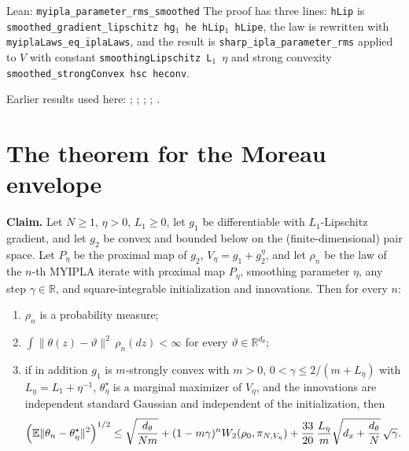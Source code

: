 \documentclass[11pt,a4paper]{article}
\begin{document}
\begin{leanbox}{Lean: \texttt{myipla\_\allowbreak{}parameter\_\allowbreak{}rms\_\allowbreak{}smoothed}}
The proof has three lines: \texttt{h\allowbreak{}Lip} is \texttt{smoothed\_\allowbreak{}gradient\_\allowbreak{}lipschitz hg\ensuremath{{}_{1}} he h\allowbreak{}Lip\ensuremath{{}_{1}} h\allowbreak{}Lipe}, the law is rewritten with \texttt{myipla\allowbreak{}Laws\_\allowbreak{}eq\_\allowbreak{}ipla\allowbreak{}Laws}, and the result is \texttt{sharp\_\allowbreak{}ipla\_\allowbreak{}parameter\_\allowbreak{}rms} applied to \(V\) with constant \texttt{smoothing\allowbreak{}Lipschitz L\ensuremath{{}_{1}} \ensuremath{\eta}} and strong convexity \texttt{smoothed\_\allowbreak{}strong\allowbreak{}Convex hsc heconv}.
\end{leanbox}


Earlier results used here: \cite[Section~3.17.4]{LangevinLean2026ULASC}; \cite[Section~3.1.1]{LangevinLean2026IPLA}; \cite[Section~3.1.6]{LangevinLean2026IPLA}; \cite[Section~3.3.1]{LangevinLean2026IPLA}; \cite[Section~3.3.2]{LangevinLean2026IPLA}.

\section{\texorpdfstring{The theorem for the Moreau envelope}{The theorem for the Moreau envelope}}


\textbf{Claim.} Let \(N\ge1\), \(\eta>0\), \(L_1\ge0\), let \(g_1\) be differentiable with \(L_1\)-Lipschitz gradient, and let \(g_2\) be convex and bounded below on the (finite-dimensional) pair space. Let \(P_\eta\) be the proximal map of \(g_2\), \(V_\eta=g_1+g_2^\eta\), and let \(\rho_n\) be the law of the \(n\)-th MYIPLA iterate with proximal map \(P_\eta\), smoothing parameter \(\eta\), any step \(\gamma\in\mathbb R\), and square-integrable initialization and innovations. Then for every \(n\):



\begin{enumerate}


\item \(\rho_n\) is a probability measure;

\item \(\int\|\theta(z)-\vartheta\|^2\,\rho_n(dz)<\infty\) for every \(\vartheta\in\mathbb R^{d_\theta}\);

\item if in addition \(g_1\) is \(m\)-strongly convex with \(m>0\), \(0<\gamma\le2/(m+L_\eta)\) with \(L_\eta=L_1+\eta^{-1}\), \(\theta^\star_\eta\) is a marginal maximizer of \(V_\eta\), and the innovations are independent standard Gaussian and independent of the initialization, then
\[\Bigl(\mathbb E\|\theta_n-\theta^\star_\eta\|^2\Bigr)^{1/2}\le\sqrt{\frac{d_\theta}{Nm}}+(1-m\gamma)^nW_2(\rho_0,\pi_{N,V_\eta})+\frac{33}{20}\,\frac{L_\eta}{m}\sqrt{d_x+\frac{d_\theta}N}\,\sqrt\gamma .\]

\end{enumerate}
\end{document}
